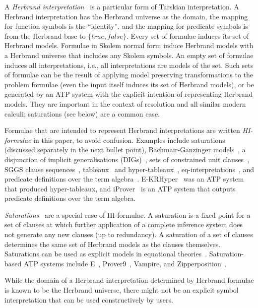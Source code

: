 \documentclass{ceurart}
\newenvironment{packed_itemize}{
\vspace*{-0.3em}
\begin{itemize}
\setlength{\partopsep}{0pt}
\setlength{\itemsep}{1pt}
\setlength{\parskip}{0pt}
\setlength{\parsep}{0pt}
}{\end{itemize}}
\begin{document}
A \emph{Herbrand interpretation}~\cite{Her30} is a particular form of Tarskian interpretation.
A Herbrand interpretation has the Herbrand universe as the domain, the mapping for function symbols
is the ``identity'', and the mapping for predicate symbols is from the Herbrand base to 
$\{\textit{true},\textit{false}\}$.
Every set of formulae induces its set of Herbrand models.
Formulae in Skolem normal form induce Herbrand models with a Herbrand universe that includes any 
Skolem symbols. 
An empty set of formulae induces all interpretations, i.e., all interpretations are models
of the set.
Such sets of formulae can be the result of applying model preserving transformations to the 
problem formulae (even the input itself induces its set of Herbrand models), or be generated 
by an ATP system with the explicit intention of representing Herbrand models.
They are important in the context of resolution and all similar modern calculi; saturations (see 
below) are a common case.
\begin{packed_itemize}
\item Formulae that are intended to represent Herbrand interpretations are written 
      \emph{HI-formulae} in this paper, to avoid confusion.
      Examples include saturations (discussed separately in the next bullet point), 
      Bachmair-Ganzinger models~\cite{BG94,Lyn13}, a disjunction of implicit generalisations 
      (DIGs)~\cite{LM87}, sets of constrained unit clauses~\cite{CZ92,CP95,CP95-TAB}, SGGS clause 
      sequences~\cite{BP16}, tableaux~\cite{Hah01}
      and hyper-tableaux~\cite{BFN96}, eq-interpretations~\cite{Pel03-EQMC}, and 
      predicate definitions over the term algebra~\cite{SK12}.
      E-KRHyper~\cite{PW07} was an ATP system that produced hyper-tableaux, and
      iProver~\cite{Kor08,SK12} is an ATP system that outputs predicate definitions 
      over the term algebra.
\item \emph{Saturations}~\cite{BG+01,Pel03-JSC} are a special case of HI-formulae.
      A saturation is a fixed point for a set of clauses at which further application of a
      complete inference system does not generate any new clauses (up to redundancy).
      A saturation of a set of clauses determines the same set of Herbrand models as 
      the clauses themselves.
      Saturations can be used as explicit models in equational theories~\cite{JRS26-arXiv}.
      Saturation-based ATP systems include E~\cite{SCV19}, Prover9~\cite{McC-Prover9-URL}, 
      Vampire, and Zipperposition~\cite{VB+21}.
\end{packed_itemize}
While the domain of a Herbrand interpretation determined by Herbrand formulae is known to be the 
Herbrand universe, there might not be an explicit symbol interpretation that can be used 
constructively by users.
\end{document}
